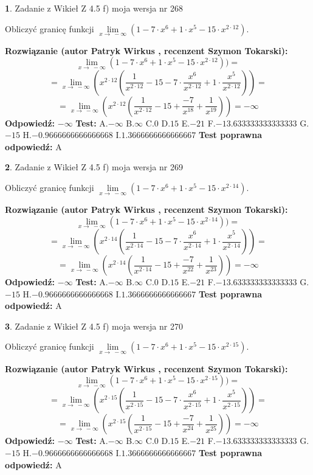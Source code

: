 \documentclass[12pt, a4paper]{article}
\theoremstyle{definition} %
\newtheorem{zad}{}
\newcommand{\zadStart}[1]{\begin{zad}#1\newline}
\newcommand{\zadStop}{\end{zad}}
\newcommand{\rozwStart}[2]{\noindent \textbf{Rozwiązanie (autor #1 , recenzent #2): }\newline}
\newcommand{\rozwStop}{\newline}
\newcommand{\odpStart}{\noindent \textbf{Odpowiedź:}\newline}
\newcommand{\odpStop}{\newline}
\newcommand{\testStart}{\noindent \textbf{Test:}\newline}
\newcommand{\testStop}{\newline}
\newcommand{\kluczStart}{\noindent \textbf{Test poprawna odpowiedź:}\newline}
\newcommand{\kluczStop}{\newline}
\begin{document}
\zadStart{Zadanie z Wikieł Z 4.5 f) moja wersja nr 268}


Obliczyć granicę funkcji  $\lim\limits_{x\to\ -\infty}(1 - 7 \cdot x^{6}+1 \cdot x^{5}- 15 \cdot x^{2\cdot12})$.
\zadStop
\rozwStart{Patryk Wirkus}{Szymon Tokarski}
$$\lim\limits_{x\to\ -\infty}(1 - 7 \cdot x^{6}+1 \cdot x^{5}- 15 \cdot x^{2\cdot12}))=$$
$$=\lim\limits_{x\to\ -\infty}(x^{2\cdot12}(\frac{1}{x^{2\cdot12}}-15 -7 \cdot \frac{x^{6}}{x^{2\cdot12}}+1 \cdot \frac{x^{5}}{x^{2\cdot12}}))=$$
$$=\lim\limits_{x\to\ -\infty}(x^{2\cdot12}(\frac{1}{x^{2\cdot12}}-15 + \frac{-7}{x^{18}}+ \frac{1}{x^{19}}))=-\infty$$
\rozwStop
\odpStart
$-\infty$
\odpStop
\testStart
A.$-\infty$ B.$\infty$ C.$0$ D.$15$ E.$-21$
F.$-13.633333333333333$ G.$-15$
H.$-0.9666666666666668$
I.$1.3666666666666667$
\testStop
\kluczStart
A
\kluczStop



\zadStart{Zadanie z Wikieł Z 4.5 f) moja wersja nr 269}


Obliczyć granicę funkcji  $\lim\limits_{x\to\ -\infty}(1 - 7 \cdot x^{6}+1 \cdot x^{5}- 15 \cdot x^{2\cdot14})$.
\zadStop
\rozwStart{Patryk Wirkus}{Szymon Tokarski}
$$\lim\limits_{x\to\ -\infty}(1 - 7 \cdot x^{6}+1 \cdot x^{5}- 15 \cdot x^{2\cdot14}))=$$
$$=\lim\limits_{x\to\ -\infty}(x^{2\cdot14}(\frac{1}{x^{2\cdot14}}-15 -7 \cdot \frac{x^{6}}{x^{2\cdot14}}+1 \cdot \frac{x^{5}}{x^{2\cdot14}}))=$$
$$=\lim\limits_{x\to\ -\infty}(x^{2\cdot14}(\frac{1}{x^{2\cdot14}}-15 + \frac{-7}{x^{22}}+ \frac{1}{x^{23}}))=-\infty$$
\rozwStop
\odpStart
$-\infty$
\odpStop
\testStart
A.$-\infty$ B.$\infty$ C.$0$ D.$15$ E.$-21$
F.$-13.633333333333333$ G.$-15$
H.$-0.9666666666666668$
I.$1.3666666666666667$
\testStop
\kluczStart
A
\kluczStop



\zadStart{Zadanie z Wikieł Z 4.5 f) moja wersja nr 270}


Obliczyć granicę funkcji  $\lim\limits_{x\to\ -\infty}(1 - 7 \cdot x^{6}+1 \cdot x^{5}- 15 \cdot x^{2\cdot15})$.
\zadStop
\rozwStart{Patryk Wirkus}{Szymon Tokarski}
$$\lim\limits_{x\to\ -\infty}(1 - 7 \cdot x^{6}+1 \cdot x^{5}- 15 \cdot x^{2\cdot15}))=$$
$$=\lim\limits_{x\to\ -\infty}(x^{2\cdot15}(\frac{1}{x^{2\cdot15}}-15 -7 \cdot \frac{x^{6}}{x^{2\cdot15}}+1 \cdot \frac{x^{5}}{x^{2\cdot15}}))=$$
$$=\lim\limits_{x\to\ -\infty}(x^{2\cdot15}(\frac{1}{x^{2\cdot15}}-15 + \frac{-7}{x^{24}}+ \frac{1}{x^{25}}))=-\infty$$
\rozwStop
\odpStart
$-\infty$
\odpStop
\testStart
A.$-\infty$ B.$\infty$ C.$0$ D.$15$ E.$-21$
F.$-13.633333333333333$ G.$-15$
H.$-0.9666666666666668$
I.$1.3666666666666667$
\testStop
\kluczStart
A
\kluczStop
\end{document}
